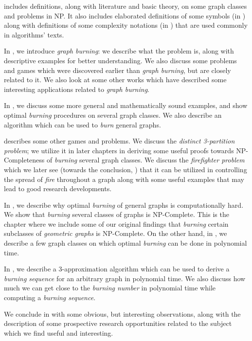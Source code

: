  includes definitions, along with literature and basic theory, on some graph classes and problems in NP. It also includes elaborated definitions of some symbols (in ) along with definitions of some complexity notations (in ) that are used commonly in algorithms' texts.

In , we introduce \textit{graph burning}: we describe what the problem is, along with descriptive examples for better understanding. We also discuss some problems and games which were discovered earlier than \textit{graph burning}, but are closely related to it. We also look at some other works which have described some interesting applications related to \textit{graph burning}.

In , we discuss some more general and mathematically sound examples, and show optimal \textit{burning} procedures on several graph classes. We also describe an algorithm which can be used to \textit{burn} general graphs.

 describes some other games and problems. We discuss the \textit{distinct 3-partition problem}; we utilize it in later chapters in deriving some useful proofs towards NP-Completeness of \textit{burning} several graph classes. We discuss the \textit{firefighter problem} which we later see (towards the conclusion, ) that it can be utilized in controlling the spread of \textit{fire} throughout a graph along with some useful examples that may lead to good research developments.

In , we describe why optimal \textit{burning} of general graphs is computationally hard. We show that \textit{burning} several classes of graphs is NP-Complete. This is the chapter where we include some of our original findings that \textit{burning} certain subclasses of \textit{geometric graphs} is NP-Complete. On the other hand, in , we describe a few graph classes on which optimal \textit{burning} can be done in polynomial time.

In , we describe a 3-approximation algorithm which can be used to derive a \textit{burning sequence} for an arbitrary graph in polynomial time. We also discuss how much we can get close to the \textit{burning number} in polynomial time while computing a \textit{burning sequence}.

We conclude in  with some obvious, but interesting observations, along with the description of some prospective research opportunities related to the subject which we find useful and interesting.

% 
% 